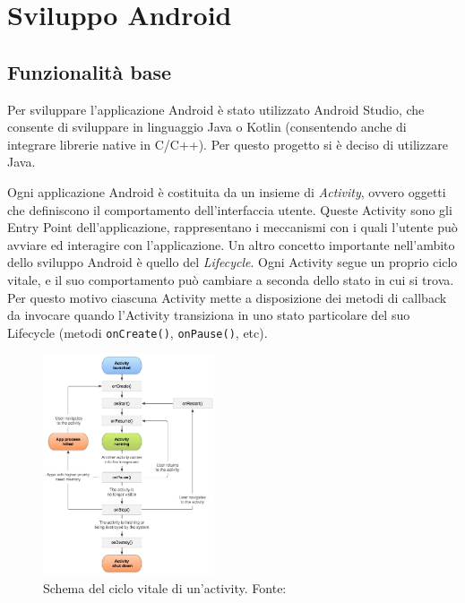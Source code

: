 \chapter{Sviluppo Android}

\section{Funzionalità base}

Per sviluppare l'applicazione Android è stato utilizzato Android Studio, che consente di sviluppare in linguaggio Java o
Kotlin (consentendo anche di integrare librerie native in C/C++). Per questo progetto si è deciso di utilizzare Java.

Ogni applicazione Android è costituita da un insieme di \textit{Activity}, ovvero oggetti che definiscono il comportamento
dell'interfaccia utente. Queste Activity sono gli Entry Point dell'applicazione, rappresentano i meccanismi con i quali
l'utente può avviare ed interagire con l'applicazione.
Un altro concetto importante nell'ambito dello sviluppo Android è quello del \textit{Lifecycle}. Ogni Activity segue un proprio
ciclo vitale, e il suo comportamento può cambiare a seconda dello stato in cui si trova. Per questo motivo ciascuna Activity
mette a disposizione dei metodi di callback da invocare quando l'Activity transiziona in uno stato particolare del suo 
Lifecycle (metodi \texttt{onCreate()}, \texttt{onPause()}, etc).

\begin{figure}[h!]
    \includegraphics[width=0.45\textwidth]{img/activity_lifecycle.jpg}
    \centering
    \caption{Schema del ciclo vitale di un'activity. Fonte: \cite{android_lifecycle}}
    \label{fig:activity_lifecycle}
\end{figure}

